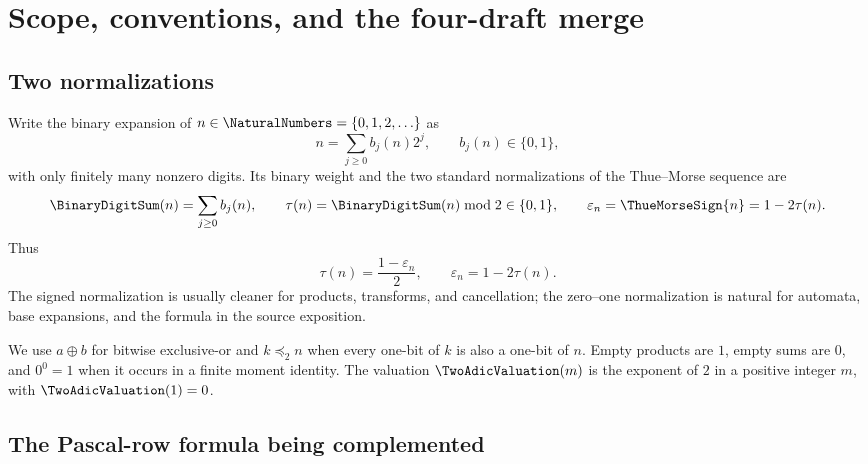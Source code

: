\documentclass[11pt,oneside]{article}
\numberwithin{equation}{section}
\theoremstyle{definition}
\theoremstyle{remark}
\newcommand{\eps}{\varepsilon}
\newcommand{\xor}{\mathbin{\oplus}}
\newcommand{\submask}{\mathrel{\preccurlyeq_2}}
\begin{document}
\begin{abstract}
Every elementary assertion is proved in the text; deeper historical results
about transcendence, substitution spectra, and evaluated products are clearly
identified and cited.  No mathematical priority is claimed for identities
merely derived here, and no formula is silently represented as already
formalized in Lean.
\end{abstract}


\newpage

\section[Four-draft merge]{Scope, conventions, and the four-draft merge}
\label{p1:sec:scope}

\subsection{Two normalizations}

Write the binary expansion of \(n\in\NaturalNumbers=\{0,1,2,\ldots\}\) as
\begin{equation}
  n=\sum_{j\ge0}b_j(n)2^j,
  \qquad b_j(n)\in\{0,1\},
  \label{p1:eq:binary-expansion}
\end{equation}
with only finitely many nonzero digits.  Its binary weight and the two standard
normalizations of the Thue--Morse sequence are
\begin{equation}
  \BinaryDigitSum(n)=\sum_{j\ge0}b_j(n),
  \qquad
  \tau(n)=\BinaryDigitSum(n)\bmod2\in\{0,1\},
  \qquad
  \eps_n=\ThueMorseSign{n}=1-2\tau(n).
  \label{p1:eq:normalizations}
\end{equation}
Thus
\begin{equation}
  \tau(n)=\frac{1-\eps_n}{2},
  \qquad
  \eps_n=1-2\tau(n).
  \label{p1:eq:normalization-bridge}
\end{equation}
The signed normalization is usually cleaner for products, transforms, and
cancellation; the zero--one normalization is natural for automata, base
expansions, and the formula in the source exposition.

We use \(a\xor b\) for bitwise exclusive-or and \(k\submask n\) when every
one-bit of \(k\) is also a one-bit of \(n\).  Empty products are \(1\), empty
sums are \(0\), and \(0^0=1\) when it occurs in a finite moment identity.
The valuation \(\TwoAdicValuation(m)\) is the exponent of \(2\) in a positive integer
\(m\), with \(\TwoAdicValuation(1)=0\).

\subsection{The Pascal-row formula being complemented}
\end{document}
